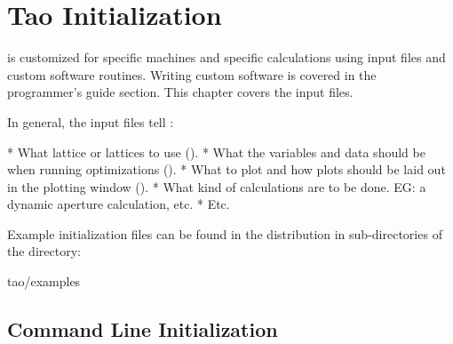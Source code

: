 \chapter{Tao Initialization}
\label{c:init}

\tao is customized for specific machines and specific calculations using input files and custom
software routines. Writing custom software is covered in the programmer's guide section. This
chapter covers the input files.

In general, the input files tell \tao:
\begin{example}
  * What \bmad lattice or lattices to use ().
  * What the variables and data should be when running optimizations ().
  * What to plot and how plots should be laid out in the plotting window ().
  * What kind of calculations are to be done. EG: a dynamic aperture calculation, etc.
  * Etc.
\end{example}

Example initialization files can be found in the \tao distribution in sub-directories of the
directory:
\begin{example}
  tao/examples
\end{example}

\section{Command Line Initialization}
\label{s:command.line} 

